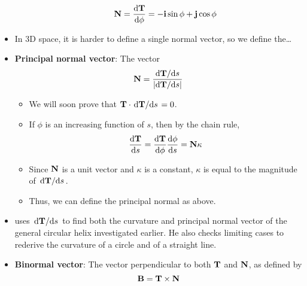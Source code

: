 \documentclass[../main.tex]{subfiles}
\begin{document}
\begin{itemize}
\begin{itemize}
        \begin{equation*}
            \vb{N} = \dv{\vb{T}}{\phi} = -\vb{i}\sin\phi+\vb{j}\cos\phi
        \end{equation*}
    \end{itemize}
    \item In 3D space, it is harder to define a single normal vector, so we define the\dots
    \item \textbf{Principal normal vector}: The vector
    \begin{equation*}
        \vb{N} = \frac{\dv*{\vb{T}}{s}}{|\text{d}\vb{T}/\text{d}s|}
    \end{equation*}
    \begin{itemize}
        \item We will soon prove that $\vb{T}\cdot\dv*{\vb{T}}{s}=0$.
        \item If $\phi$ is an increasing function of $s$, then by the chain rule,
        \begin{equation*}
            \dv{\vb{T}}{s} = \dv{\vb{T}}{\phi}\dv{\phi}{s} = \vb{N}\kappa
        \end{equation*}
        \item Since $\vb{N}$ is a unit vector and $\kappa$ is a constant, $\kappa$ is equal to the magnitude of $\dv*{\vb{T}}{s}$.
        \item Thus, we can define the principal normal as above.
    \end{itemize}
    \item \textcite{bib:Thomas} uses $\dv*{\vb{T}}{s}$ to find both the curvature and principal normal vector of the general circular helix investigated earlier. He also checks limiting cases to rederive the curvature of a circle and of a straight line.
    \item \textbf{Binormal vector}: The vector perpendicular to both $\vb{T}$ and $\vb{N}$, as defined by
    \begin{equation*}
        \vb{B} = \vb{T}\times\vb{N}
    \end{equation*}
\end{itemize}
\end{document}

